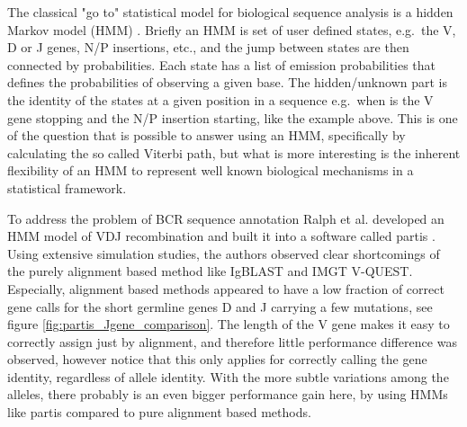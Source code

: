 The classical "go to" statistical model for biological sequence analysis is a hidden Markov model (HMM) \cite{durbin1998biological}.
Briefly an HMM is set of user defined states, e.g.\ the V, D or J genes, N/P insertions, etc., and the jump between states are then connected by probabilities.
Each state has a list of emission probabilities that defines the probabilities of observing a given base.
The hidden/unknown part is the identity of the states at a given position in a sequence e.g.\ when is the V gene stopping and the N/P insertion starting, like the example above.
This is one of the question that is possible to answer using an HMM, specifically by calculating the so called Viterbi path, but what is more interesting is the inherent flexibility of an HMM to represent well known biological mechanisms in a statistical framework.

To address the problem of BCR sequence annotation Ralph et al. developed an HMM model of VDJ recombination and built it into a software called partis \cite{ralph2016consistency}.
Using extensive simulation studies, the authors observed clear shortcomings of the purely alignment based method like IgBLAST and IMGT V-QUEST.
Especially, alignment based methods appeared to have a low fraction of correct gene calls for the short germline genes D and J carrying a few mutations, see figure \ref{fig:partis_Jgene_comparison}.
The length of the V gene makes it easy to correctly assign just by alignment, and therefore little performance difference was observed, however notice that this only applies for correctly calling the gene identity, regardless of allele identity.
With the more subtle variations among the alleles, there probably is an even bigger performance gain here, by using HMMs like partis compared to pure alignment based methods.

